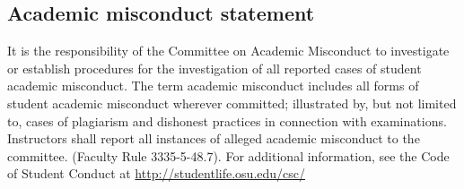 \documentclass{ximera}
\begin{document}
\subsection*{Academic misconduct statement}
It is the responsibility of the Committee on Academic Misconduct to investigate or establish procedures for the investigation of all reported cases of student academic misconduct. The term academic misconduct includes all forms of student academic misconduct wherever committed; illustrated by, but not limited to, cases of plagiarism and dishonest practices in connection with examinations. Instructors shall report all instances of alleged academic misconduct to the committee. (Faculty Rule 3335-5-48.7). For additional information, see the Code of Student Conduct at \href{http://studentlife.osu.edu/csc/}{http://studentlife.osu.edu/csc/}
\end{document}
